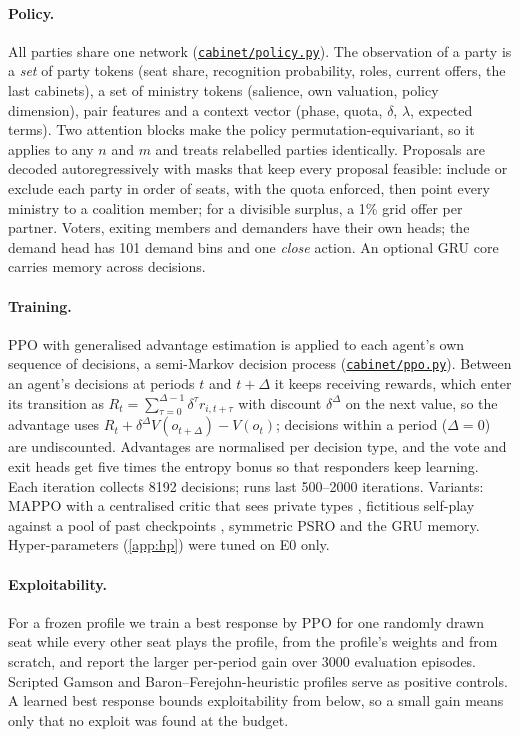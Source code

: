 \documentclass[11pt,a4paper]{article}
\newcommand{\repo}{https://github.com/bot2048/cabinet-bargaining-marl}
\newcommand{\code}[1]{\href{\repo/blob/main/#1}{\texttt{\small #1}}}
\begin{document}
\paragraph{Policy.} All parties share one network (\code{cabinet/policy.py}). The observation of a party
is a \emph{set} of party tokens (seat share, recognition probability, roles, current offers, the last
cabinets), a set of ministry tokens (salience, own valuation, policy dimension), pair features and a
context vector (phase, quota, $\delta$, $\lambda$, expected terms). Two attention blocks make the policy
permutation-equivariant, so it applies to any $n$ and $m$ and treats relabelled parties identically.
Proposals are decoded autoregressively with masks that keep every proposal feasible: include or exclude
each party in order of seats, with the quota enforced, then point every ministry to a coalition member;
for a divisible surplus, a 1\% grid offer per partner. Voters, exiting members and demanders have their
own heads; the demand head has 101 demand bins and one \emph{close} action. An optional GRU core carries
memory across decisions.

\paragraph{Training.} PPO \citep{schulman2017} with generalised advantage estimation
\citep{schulman2016} is applied to each agent's own sequence of decisions, a semi-Markov decision process
(\code{cabinet/ppo.py}). Between an agent's decisions at periods $t$ and $t+\Delta$ it keeps receiving
rewards, which enter its transition as $R_t=\sum_{\tau=0}^{\Delta-1}\delta^{\tau}r_{i,t+\tau}$ with
discount $\delta^{\Delta}$ on the next value, so the advantage uses
$R_t+\delta^{\Delta}V(o_{t+\Delta})-V(o_t)$; decisions within a period ($\Delta=0$) are undiscounted. Advantages are normalised per decision type, and the
vote and exit heads get five times the entropy bonus so that responders keep learning. Each iteration
collects 8192 decisions; runs last 500--2000 iterations. Variants: MAPPO with a centralised critic that
sees private types \citep{yu2022}, fictitious self-play against a pool of past checkpoints
\citep{heinrich2016}, symmetric PSRO \citep{lanctot2017} and the GRU memory. Hyper-parameters
(\cref{app:hp}) were tuned on E0 only.

\paragraph{Exploitability.} For a frozen profile we train a best response by PPO for one randomly drawn
seat while every other seat plays the profile, from the profile's weights and from scratch, and report
the larger per-period gain over 3000 evaluation episodes. Scripted Gamson and Baron--Ferejohn-heuristic
profiles serve as positive controls. A learned best response bounds exploitability from below, so a small
gain means only that no exploit was found at the budget.
\end{document}
